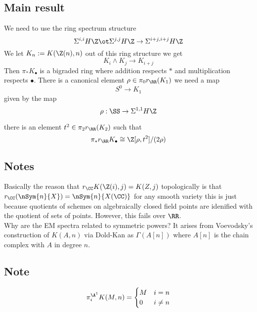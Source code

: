\documentclass{article}
\begin{document}
\subsection{Main result}

We need to use the ring spectrum structure 
\[ \Sigma^{i,i} H \Z \ot \Sigma^{j,j} H \Z \to \Sigma^{i+j,i+j} H \Z \]
We let $K_n := K(\Z(n),n)$ out of this ring structure we get 
\[ K_i \wedge K_j \to K_{i+j} \]
Then $\pi_* K_\bullet$ is a bigraded ring where addition respects $*$ and multiplication respects $\bullet$. There is a canonical element $\rho \in \pi_0 r_{\RR}(K_1)$ we need a map
\[ S^0 \to K_1 \]
given by the map
\[ \rho : \SS \to \Sigma^{1,1} H \Z \]

\begin{theorem}
there is an element $t^2 \in \pi_2 r_{\RR}(K_2)$ such that
\[ \pi_* r_{\RR} K_\bullet \cong \Z[\rho, t^2] / (2 \rho) \]
\end{theorem}

\subsection{Notes}

Basically the reason that $r_{\CC} K(\Z(i), j) = K(Z, j)$ topologically is that $r_{\CC} (\nSym{n}{X}) = \nSym{n}{X(\CC)}$ for any smooth variety this is just because quotients of schemes on algebraically closed field points are idenified with the quotient of sets of points. However, this fails over $\RR$. 
\bigskip\\
Why are the EM spectra related to symmetric powers? It arises from Voevodsky's construction of $K(A, n)$ via Dold-Kan as $\Gamma(A[n])$ where $A[n]$ is the chain complex with $A$ in degree $n$.

\subsection{Note}

\[ \pi_i^{\A^1} K(M,n) = \begin{cases}
M & i = n
\\
0 & i \neq n
\end{cases} \]
\end{document}
